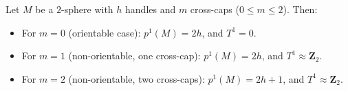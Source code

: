 Let $M$ be a $2$-sphere with $h$ handles and $m$ cross-caps ($0 \leqslant m \leqslant 2$). Then:
\begin{itemize}
\item For $m = 0$ (orientable case): $p^1(M) = 2h$, and $T^1 = 0$.
\item For $m = 1$ (non-orientable, one cross-cap): $p^1(M) = 2h$, and $T^1 \approx \mathbf{Z}_2$.
\item For $m = 2$ (non-orientable, two cross-caps): $p^1(M) = 2h + 1$, and $T^1 \approx \mathbf{Z}_2$.
\end{itemize}
